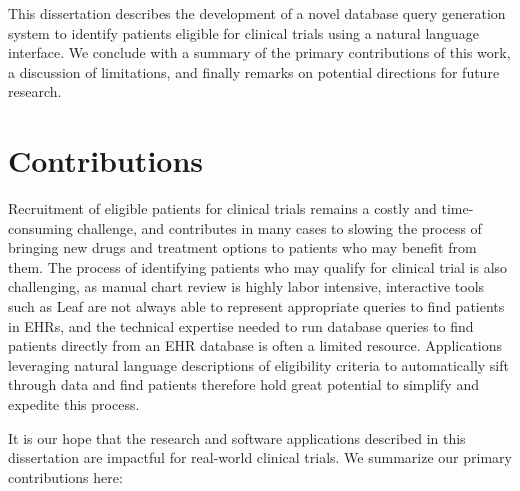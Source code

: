 \documentclass[../main.tex]{subfiles}
\begin{document}
This dissertation describes the development of a novel database query generation system to identify patients eligible for clinical trials using a natural language interface. We conclude with a summary of the primary contributions of this work, a discussion of limitations, and finally remarks on potential directions for future research.

\section{Contributions}

Recruitment of eligible patients for clinical trials remains a costly and time-consuming challenge, and contributes in many cases to slowing the process of bringing new drugs and treatment options to patients who may benefit from them. The process of identifying patients who may qualify for clinical trial is also challenging, as manual chart review is highly labor intensive, interactive tools such as Leaf are not always able to represent appropriate queries to find patients in EHRs, and the technical expertise needed to run database queries to find patients directly from an EHR database is often a limited resource. Applications leveraging natural language descriptions of eligibility criteria to automatically sift through data and find patients therefore hold great potential to simplify and expedite this process.

It is our hope that the research and software applications described in this dissertation are impactful for real-world clinical trials. We summarize our primary contributions here:
\end{document}
